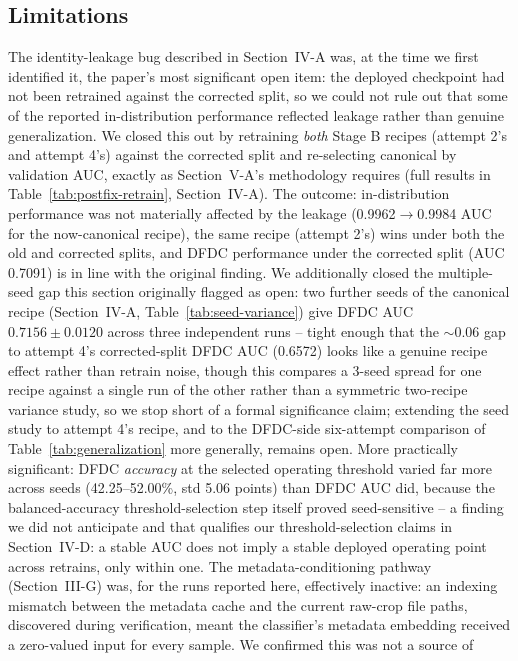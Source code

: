 \documentclass[conference]{IEEEtran}
\begin{document}
\subsection{Limitations}
The identity-leakage bug described in Section~IV-A was, at the time we
first identified it, the paper's most significant open item: the deployed
checkpoint had not been retrained against the corrected split, so we could
not rule out that some of the reported in-distribution performance
reflected leakage rather than genuine generalization. We closed this out by
retraining \emph{both} Stage B recipes (attempt 2's and attempt 4's) against
the corrected split and re-selecting canonical by validation AUC, exactly as
Section~V-A's methodology requires (full results in
Table~\ref{tab:postfix-retrain}, Section~IV-A). The outcome: in-distribution
performance was not materially affected by the leakage (0.9962$\to$0.9984
AUC for the now-canonical recipe), the same recipe (attempt 2's) wins under
both the old and corrected splits, and DFDC performance under the corrected
split (AUC 0.7091) is in line with the original finding. We additionally
closed the multiple-seed gap this section originally flagged as open: two
further seeds of the canonical recipe (Section~IV-A, Table~\ref{tab:seed-variance})
give DFDC AUC $0.7156 \pm 0.0120$ across three independent runs -- tight
enough that the $\sim$0.06 gap to attempt 4's corrected-split DFDC AUC
(0.6572) looks like a genuine recipe effect rather than retrain noise,
though this compares a 3-seed spread for one recipe against a single run
of the other rather than a symmetric two-recipe variance study, so we stop
short of a formal significance claim; extending the seed study to attempt
4's recipe, and to the DFDC-side six-attempt comparison of
Table~\ref{tab:generalization} more generally, remains open. More
practically significant: DFDC \emph{accuracy} at the selected operating
threshold varied far more across seeds (42.25--52.00\%, std 5.06 points)
than DFDC AUC did, because the balanced-accuracy threshold-selection step
itself proved seed-sensitive -- a finding we did not anticipate and that
qualifies our threshold-selection claims in Section~IV-D: a stable AUC does
not imply a stable deployed operating point across retrains, only within
one. The metadata-conditioning pathway (Section~III-G) was, for the runs
reported here, effectively inactive: an indexing mismatch between the
metadata cache and the current raw-crop file paths, discovered during
verification, meant the classifier's metadata embedding received a
zero-valued input for every sample. We confirmed this was not a source of
\end{document}
